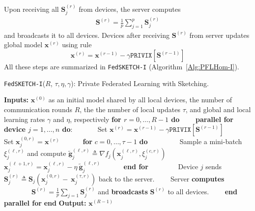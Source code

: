 Upon receiving all $\mathbf{S}_j^{(r)}$ from devices, the server computes 
\begin{align}
    \mathbf{S}^{(r)}=\frac{1}{p}\sum_{j=1}^p\mathbf{S}_j^{(r)}
\end{align}
and broadcasts it to all devices. Devices after receiving $\mathbf{S}^{(r)}$ from server updates  global model $\boldsymbol{x}^{(r)}$ using rule $$\boldsymbol{x}^{(r)}=\boldsymbol{x}^{(r-1)}-\gamma \texttt{PRIVIX}\left[\mathbf{S}^{(r-1)}\right]$$
All these steps are summarized in \texttt{FedSKETCH-I} (Algorithm~\ref{Alg:PFLHom-I}).
\begin{algorithm}[H]
\caption{\texttt{FedSKETCH-I}($R$, $\tau, \eta, \gamma$): Private Federated Learning with Sketching. }\label{Alg:PFLHom-I}
\begin{algorithmic}[1]
\State \textbf{Inputs:} $\boldsymbol{x}^{(0)}$ as an initial  model shared by all local devices, the number of communication rounds $R$, the the number of local updates $\tau$, and global and local learning rates $\gamma$ and $\eta$, respectively
\State \textbf{for $r=0, \ldots, R-1$ do}
\State $\qquad$\textbf{parallel for device $j=1,\ldots,n$ do}:
\State $\qquad\quad$ Set $\boldsymbol{x}^{(r)}=\boldsymbol{x}^{(r-1)}-\gamma{\texttt{PRIVIX}}\left[{\mathbf{S}}^{(r-1)}\right]$ 
\State $\qquad\quad$ Set $\boldsymbol{x}_j^{(0,r)}=\boldsymbol{x}^{(r)}$ 
\State $\qquad\quad $\textbf{for} $c=0,\ldots,\tau-1$ \textbf{do}
\State $\qquad\quad\quad$ Sample a mini-batch $\xi_j^{(\ell,r)}$ and compute $\tilde{\mathbf{g}}_{j}^{(\ell,r)}\triangleq\nabla{f}_j(\boldsymbol{x}^{(\ell,r)}_j,\xi_j^{(c,r)})$
\State $\qquad\quad\quad$ $\boldsymbol{x}^{(\ell+1,r)}_{j}=\boldsymbol{x}^{(\ell,r)}_j-\eta~ \tilde{\mathbf{g}}_{j}^{(\ell,r)}$ \label{eq:update-rule-alg}
\State $\qquad\quad$\textbf{end for}
\State $\qquad\quad\quad$Device $j$ sends $\mathbf{S}^{(r)}_{j}\triangleq\mathbf{S}_{j}\left(\boldsymbol{x}_j^{(0,r)}-~{\boldsymbol{x}}_{j}^{(\tau,r)}\right)$ back to the server.
\State $\qquad$Server \textbf{computes} 
\State $\qquad\qquad {\mathbf{S}}^{(r)}=\frac{1}{p}\sum_{j=1}\mathbf{S}^{(r)}_{j}$ and \textbf{broadcasts} ${\mathbf{S}}^{(r)}$ to all devices.
\State $\qquad$\textbf{end parallel for}
\State \textbf{end}
\State \textbf{Output:} ${\boldsymbol{x}}^{(R-1)}$
\vspace{- 0.1cm}
\end{algorithmic}
\end{algorithm}

